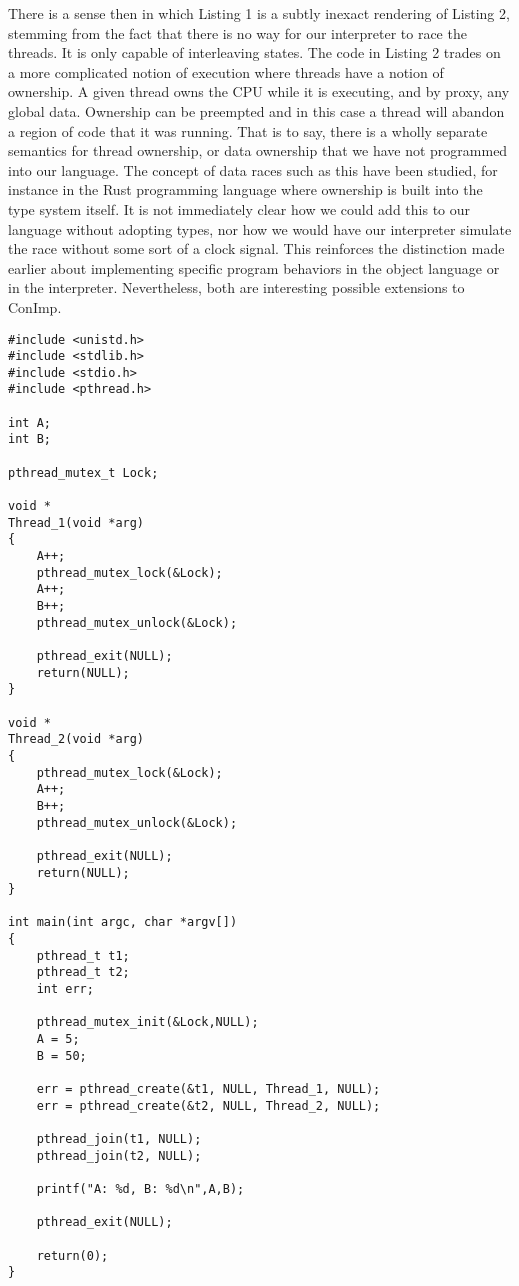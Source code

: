 There is a sense then in which Listing 1 is a subtly inexact rendering of Listing 2, stemming from the fact that there is no way for our interpreter to race the threads.  It is only capable of interleaving states.  The code in Listing 2 trades on a more complicated notion of execution where threads have a notion of ownership.  A given thread owns the CPU while it is executing, and by proxy, any global data.  Ownership can be preempted and in this case a thread will abandon a region of code that it was running.  That is to say, there is a wholly separate semantics for thread ownership, or data ownership that we have not programmed into our language.  The concept of data races such as this have been studied, for instance in the Rust programming language \cite{rust} where ownership is built into the type system itself.  It is not immediately clear how we could add this to our language without adopting types, nor how we would have our interpreter simulate the race without some sort of a clock signal.  This reinforces the distinction made earlier about implementing specific program behaviors in the object language or in the interpreter.  Nevertheless, both are interesting possible extensions to ConImp.  

\begin{lstlisting}[caption={Two threads concurrently updating a global store (C).},captionpos=b,frame=single]
#include <unistd.h>
#include <stdlib.h>
#include <stdio.h>
#include <pthread.h>

int A;
int B;

pthread_mutex_t Lock;

void *
Thread_1(void *arg)
{
	A++;
	pthread_mutex_lock(&Lock);
	A++;
	B++;
	pthread_mutex_unlock(&Lock);

	pthread_exit(NULL);
	return(NULL);
}

void *
Thread_2(void *arg)
{
	pthread_mutex_lock(&Lock);
	A++;
	B++;
	pthread_mutex_unlock(&Lock);

	pthread_exit(NULL);
	return(NULL);
}

int main(int argc, char *argv[])
{
	pthread_t t1;
	pthread_t t2;
	int err;

	pthread_mutex_init(&Lock,NULL);
	A = 5;
	B = 50;

	err = pthread_create(&t1, NULL, Thread_1, NULL);
	err = pthread_create(&t2, NULL, Thread_2, NULL);

	pthread_join(t1, NULL);
	pthread_join(t2, NULL);

	printf("A: %d, B: %d\n",A,B);

	pthread_exit(NULL);

	return(0);
}
\end{lstlisting}
